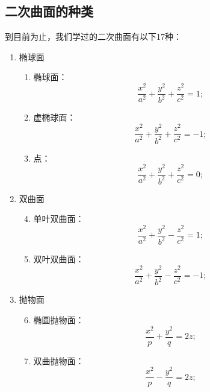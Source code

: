 \subsection{二次曲面的种类}\label{section:解析几何.二次曲面的种类}
到目前为止，我们学过的二次曲面有以下17种：
\begin{enumerate}[label={\chinese*.}]
	\item 椭球面
	\begin{enumerate}[label={\arabic*.}]
		\item 椭球面：\begin{equation*}
			\frac{x^2}{a^2}+\frac{y^2}{b^2}+\frac{z^2}{c^2}=1;
		\end{equation*}

		\item 虚椭球面：\begin{equation*}
			\frac{x^2}{a^2}+\frac{y^2}{b^2}+\frac{z^2}{c^2}=-1;
		\end{equation*}

		\item 点：\begin{equation*}
			\frac{x^2}{a^2}+\frac{y^2}{b^2}+\frac{z^2}{c^2}=0;
		\end{equation*}
	\end{enumerate}

	\item 双曲面
	\begin{enumerate}[label={\arabic*.}]
		\setcounter{enumii}{3}
		\item 单叶双曲面：\begin{equation*}
			\frac{x^2}{a^2}+\frac{y^2}{b^2}-\frac{z^2}{c^2}=1;
		\end{equation*}

		\item 双叶双曲面：\begin{equation*}
			\frac{x^2}{a^2}+\frac{y^2}{b^2}-\frac{z^2}{c^2}=-1;
		\end{equation*}
	\end{enumerate}

	\item 抛物面
	\begin{enumerate}[label={\arabic*.}]
		\setcounter{enumii}{5}
		\item 椭圆抛物面：\begin{equation*}
			\frac{x^2}{p}+\frac{y^2}{q}=2z;
		\end{equation*}

		\item 双曲抛物面：\begin{equation*}
			\frac{x^2}{p}-\frac{y^2}{q}=2z;
		\end{equation*}
	\end{enumerate}


\end{enumerate}
